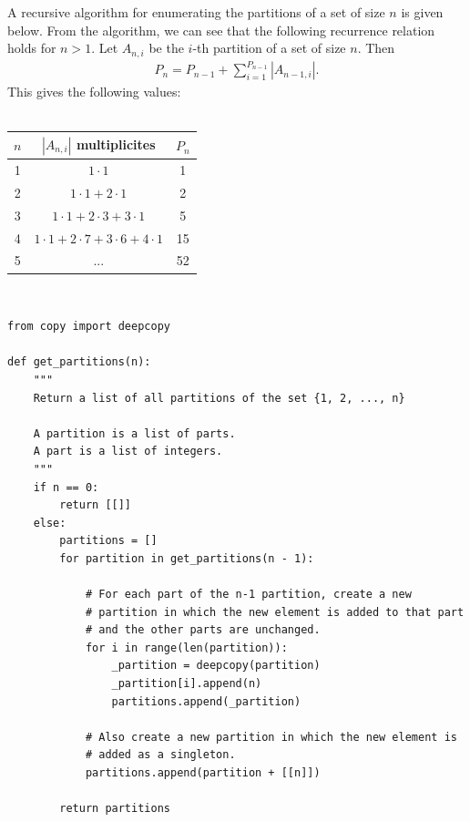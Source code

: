 \documentclass[12pt]{article}
\begin{document}
\begin{mdframed}
  A recursive algorithm for enumerating the partitions of a set of size $n$ is
  given below. From the algorithm, we can see that the following recurrence
  relation holds for $n > 1$. Let $A_{n,i}$ be the $i$-th partition of a set of
  size $n$. Then
  \begin{align*}
    P_n = P_{n-1} + \sum_{i=1}^{P_{n-1}}|A_{n-1,i}|.
  \end{align*}
  This gives the following values:\\\\
  \begin{tabular}{c|c|c}
    $n$ & $|A_{n,i}|$ multiplicites& $P_n$\\
    \hline
    1 & $1 \cdot 1$                                     & 1  \\
    2 & $1 \cdot 1 + 2 \cdot 1$                         & 2  \\
    3 & $1 \cdot 1 + 2 \cdot 3 + 3 \cdot 1$             & 5  \\
    4 & $1 \cdot 1 + 2 \cdot 7 + 3 \cdot 6 + 4 \cdot 1$ & 15 \\
    5 & ...                                             & 52 \\
  \end{tabular}\\
  \newpage
  \begin{verbatim}
from copy import deepcopy

def get_partitions(n):
    """
    Return a list of all partitions of the set {1, 2, ..., n}

    A partition is a list of parts.
    A part is a list of integers.
    """
    if n == 0:
        return [[]]
    else:
        partitions = []
        for partition in get_partitions(n - 1):

            # For each part of the n-1 partition, create a new
            # partition in which the new element is added to that part
            # and the other parts are unchanged.
            for i in range(len(partition)):
                _partition = deepcopy(partition)
                _partition[i].append(n)
                partitions.append(_partition)

            # Also create a new partition in which the new element is
            # added as a singleton.
            partitions.append(partition + [[n]])

        return partitions
  \end{verbatim}
\end{mdframed}
\end{document}
